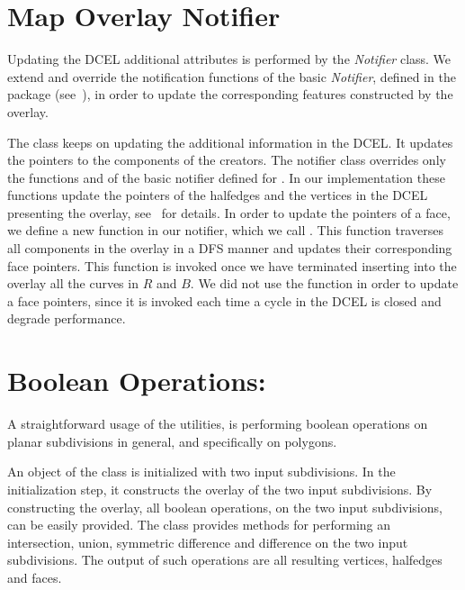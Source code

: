 \begin{ccTexOnly}
\section{Map Overlay Notifier}
\label{sec:notifier}
Updating the DCEL additional attributes is performed by the {\em Notifier} class.
We extend and override the notification functions of the basic {\em Notifier}, 
defined in the  package 
(see~), 
in order to update the corresponding features constructed by the overlay. 

The  class 
keeps on updating the additional information in the DCEL.
It updates the pointers to the components of the creators.
The notifier class overrides only the functions  
and  of the basic notifier defined for .
In our implementation these functions update 
the pointers of the halfedges and the vertices in the DCEL 
presenting the overlay, see~ for details.
In order to update the pointers of a face, we define a new function in our 
notifier, which we call . 
This function traverses all components in the overlay in a DFS manner and 
updates their corresponding face pointers. 
This function is invoked once we have terminated 
inserting into the overlay all the curves in $R$ and $B$.
We did not use the  function in order to update a 
face pointers, since it is invoked each time a cycle in the DCEL 
is closed and degrade performance. 

\section{Boolean Operations:}
A straightforward usage of the  
utilities, is performing boolean operations on planar subdivisions in general, 
and specifically on polygons.

An object of the  class is initialized with 
two input subdivisions. In the initialization step, it constructs the overlay 
of the two input subdivisions. By constructing the overlay, all boolean operations, 
on the two input subdivisions, can be easily provided.
The   class provides methods for 
performing an intersection, union, symmetric difference and difference on the two 
input subdivisions. 
The output of such operations are all resulting vertices, halfedges and faces.


\end{ccTexOnly}
